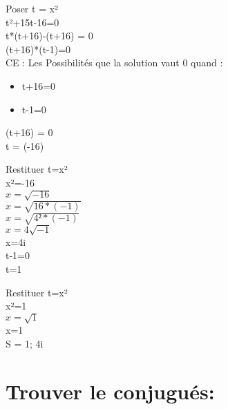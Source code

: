 Poser t = x² \\

t²+15t-16=0 \\

t*(t+16)-(t+16) = 0 \\

(t+16)*(t-1)=0 \\


CE : Les Possibilités que la solution vaut 0 quand :

\begin{itemize}
\item {t+16=0}
\item {t-1=0}
\end{itemize}

(t+16) = 0 \\

t = (-16) \\

\vspace{5mm}

Restituer t=x² \\

x²=-16 \\

$x=\sqrt{-16}$ \\

$x=\sqrt{16 * (-1)}$ \\

$x=\sqrt{4² * (-1)}$ \\

$x=4\sqrt{-1}$ \\

x=4i \\

t-1=0 \\
t=1 \\

\vspace{5mm}

Restituer t=x² \\

x²=1 \\
$x=\sqrt{1}$ \\
x=1 \\


S = 1; 4i \\

\newpage

\vspace{3mm} %
\section{Trouver le conjugués:}
\vspace{3mm} %

